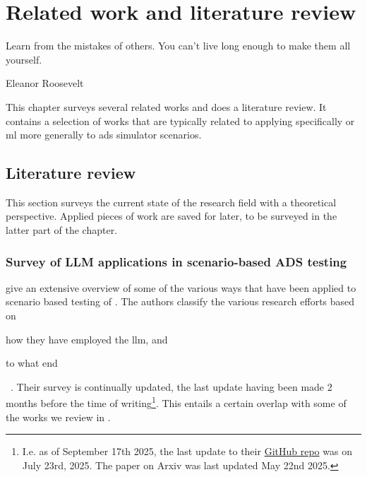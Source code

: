 \chapter{Related work and literature review}\label{chp:relatedWorkAndLitReview}

\epigraph{Learn from the mistakes of others. You can't live long enough to make them all yourself.}{Eleanor Roosevelt}

This chapter surveys several related works and does a literature review. It contains a selection of
works that are typically related to applying  specifically or \acrshort{ml} more
generally to \acrshort{ads} simulator scenarios.

\section{Literature review}\label{sec:literatureReview}

This section surveys the current state of the research field with a theoretical
perspective. Applied pieces of work are saved for later, to be surveyed in the
latter part of the chapter.

\subsection{Survey of LLM applications in scenario-based ADS testing}

\citeauthor{surveyLLMScenarioBasedTesting} give an extensive overview of some of the various ways
that  have been applied to scenario based testing of .
The authors classify the various research efforts based on \begin{inparaenum}
    \item how they have employed the \acrshort{llm}, and
    \item to what end
\end{inparaenum}~\cite{surveyLLMScenarioBasedTesting}.
Their survey is continually updated, the last update having been made 2 months before the time of
writing\footnote{I.e. as of September 17th 2025, the last update to their
    \href{https://github.com/ftgTUGraz/LLM4ADSTest}{GitHub repo} was on July 23rd, 2025. The paper on
    Arxiv was last updated May 22nd 2025.}. This entails a certain overlap with some of the works we
review in .

